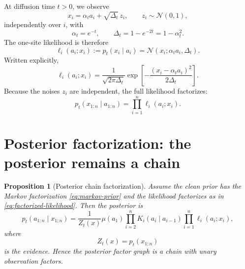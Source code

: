 \documentclass[11pt]{article}
\newtheorem{proposition}{Proposition}
\newcommand{\Normal}{\mathcal{N}}
\begin{document}
At diffusion time \(t>0\), we observe
\begin{equation}
  x_i = \alpha_t a_i + \sqrt{\Delta_t}\,z_i,
  \qquad z_i\sim \Normal(0,1),
  \label{eq:ou-noising}
\end{equation}
independently over \(i\), with
\begin{equation}
  \alpha_t=e^{-t},
  \qquad
  \Delta_t=1-e^{-2t}=1-\alpha_t^2.
  \label{eq:alpha-delta}
\end{equation}
The one-site likelihood is therefore
\begin{equation}
  \ell_i(a_i;x_i)
  := p_t(x_i\mid a_i)
  = \Normal(x_i;\alpha_t a_i,\Delta_t).
  \label{eq:likelihood}
\end{equation}
Written explicitly,
\begin{equation}
  \ell_i(a_i;x_i)
  = \frac{1}{\sqrt{2\pi\Delta_t}}
  \exp\left[-\frac{(x_i-\alpha_t a_i)^2}{2\Delta_t}\right].
  \label{eq:likelihood-explicit}
\end{equation}
Because the noises \(z_i\) are independent, the full likelihood factorizes:
\begin{equation}
  p_t(x_{1:n}\mid a_{1:n})
  = \prod_{i=1}^n \ell_i(a_i;x_i).
  \label{eq:factorized-likelihood}
\end{equation}

\section{Posterior factorization: the posterior remains a chain}

\begin{proposition}[Posterior chain factorization]
Assume the clean prior has the Markov factorization \eqref{eq:markov-prior} and the likelihood factorizes as in \eqref{eq:factorized-likelihood}. Then the posterior is
\begin{equation}
  p_t(a_{1:n}\mid x_{1:n})
  = \frac{1}{Z_t(x)}
  \mu(a_1)
  \prod_{i=2}^n K_i(a_i\mid a_{i-1})
  \prod_{i=1}^n \ell_i(a_i;x_i),
  \label{eq:posterior-chain}
\end{equation}
where
\[
  Z_t(x)=p_t(x_{1:n})
\]
is the evidence. Hence the posterior factor graph is a chain with unary observation factors.
\end{proposition}
\end{document}
